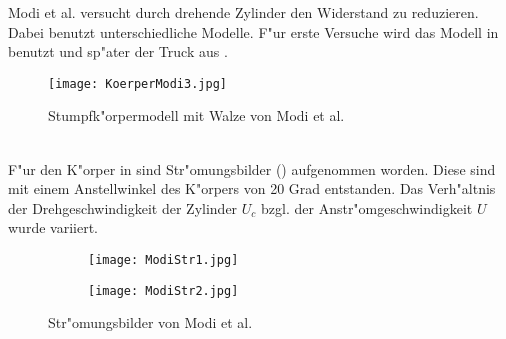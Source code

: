 Modi et al. \cite{MODI.1991} versucht durch drehende Zylinder den Widerstand zu reduzieren. Dabei benutzt \cite{MODI.1991} unterschiedliche Modelle. F"ur erste Versuche wird das Modell in  benutzt und sp"ater der Truck aus .
\begin{figure}[h]
	\centering
	\texttt{[image: KoerperModi3.jpg]}
	\caption{Stumpfk"orpermodell mit Walze von Modi et al. \cite{MODI.1991}}
	\label{fig:Modi3}
\end{figure}\\
F"ur den K"orper in  sind Str"omungsbilder () aufgenommen worden. Diese sind mit einem Anstellwinkel des K"orpers von 20 Grad entstanden. Das Verh"altnis der Drehgeschwindigkeit der Zylinder \(U_c\) bzgl. der Anstr"omgeschwindigkeit \(U\) wurde variiert.\\
\begin{figure}[h]
	\centering
	\begin{subfigure}[c]{0.4\textwidth}		
		\texttt{[image: ModiStr1.jpg]}
	\end{subfigure}
	\begin{subfigure}[c]{0.4\textwidth}
		\texttt{[image: ModiStr2.jpg]}
	\end{subfigure}
	\caption{Str"omungsbilder von Modi et al. \cite{MODI.1991}}
	\label{fig:ModiStr}
\end{figure}


